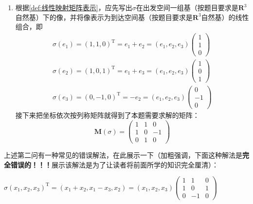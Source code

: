 \begin{solution}
\begin{enumerate}
        \item 根据\autoref{def:线性映射矩阵表示}，应先写出$\sigma$在出发空间一组基（按题目要求是$\mathbf{R}^3$自然基）下的像，并将像表示为到达空间基（按题目要求是$\mathbf{R}^3$自然基）的线性组合，即
            \begin{gather*}
                \sigma(e_1) = (1,1,0)^{\mathrm{T}}
                =e_1+e_2=(e_1,e_2,e_3)\begin{pmatrix}
                    1 \\ 1 \\ 0
                \end{pmatrix} \\
                \sigma(e_2) = (1,0,1)^{\mathrm{T}}
                =e_1+e_3=(e_1,e_2,e_3)\begin{pmatrix}
                    1 \\ 0 \\ 1
                \end{pmatrix} \\
                \sigma(e_3) = (0,-1,0)^{\mathrm{T}}
                =-e_2=(e_1,e_2,e_3)\begin{pmatrix}
                    0 \\ -1 \\ 0
                \end{pmatrix}
            \end{gather*}
            接下来把坐标依次按列称矩阵就得到了本题需要求解的矩阵：
            \[
                \mathbf{M}(\sigma)=\begin{pmatrix}
                    1 & 1 & 0  \\
                    1 & 0 & -1 \\
                    0 & 1 & 0
                \end{pmatrix}
            \]
    \end{enumerate}
\end{solution}

上述第二问有一种常见的错误解法，在此展示一下（加粗强调，下面这种解法是\textbf{完全错误的！！！}展示该解法是为了让读者将前面所学的知识完全厘清）：

\begin{solution}[错误解法！！！]
    $
        \sigma(x_1,x_2,x_3)^{\mathrm{T}}
        =(x_1+x_2,x_1-x_3, x_2)=(x_1,x_2,x_3)\begin{pmatrix}
            1 & 1  & 0 \\
            1 & 0  & 1 \\
            0 & -1 & 0
        \end{pmatrix}
    $
\end{solution}

